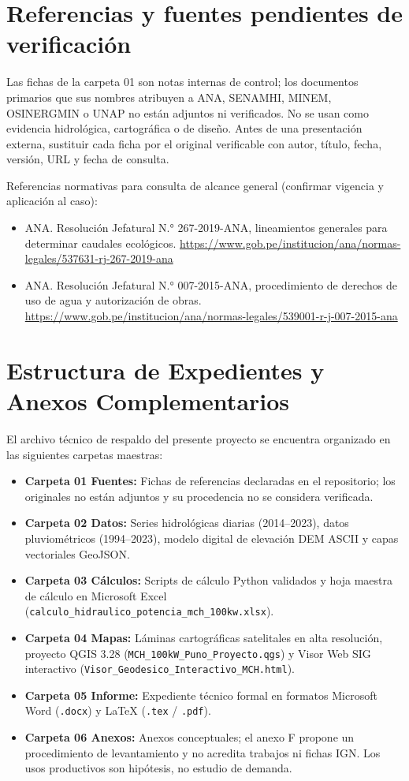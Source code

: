 \documentclass[11pt,a4paper]{report}
\begin{document}
\chapter{Referencias y fuentes pendientes de verificación}
Las fichas de la carpeta 01 son notas internas de control; los documentos primarios que sus nombres atribuyen a ANA, SENAMHI, MINEM, OSINERGMIN o UNAP no están adjuntos ni verificados. No se usan como evidencia hidrológica, cartográfica o de diseño. Antes de una presentación externa, sustituir cada ficha por el original verificable con autor, título, fecha, versión, URL y fecha de consulta.

Referencias normativas para consulta de alcance general (confirmar vigencia y aplicación al caso):
\begin{itemize}
  \item ANA. Resolución Jefatural N.° 267-2019-ANA, lineamientos generales para determinar caudales ecológicos. \url{https://www.gob.pe/institucion/ana/normas-legales/537631-rj-267-2019-ana}
  \item ANA. Resolución Jefatural N.° 007-2015-ANA, procedimiento de derechos de uso de agua y autorización de obras. \url{https://www.gob.pe/institucion/ana/normas-legales/539001-r-j-007-2015-ana}
\end{itemize}

\chapter*{Estructura de Expedientes y Anexos Complementarios}
El archivo técnico de respaldo del presente proyecto se encuentra organizado en las siguientes carpetas maestras:
\begin{itemize}
    \item \textbf{Carpeta 01 Fuentes:} Fichas de referencias declaradas en el repositorio; los originales no están adjuntos y su procedencia no se considera verificada.
    \item \textbf{Carpeta 02 Datos:} Series hidrológicas diarias (2014--2023), datos pluviométricos (1994--2023), modelo digital de elevación DEM ASCII y capas vectoriales GeoJSON.
    \item \textbf{Carpeta 03 Cálculos:} Scripts de cálculo Python validados y hoja maestra de cálculo en Microsoft Excel (\texttt{calculo\_hidraulico\_potencia\_mch\_100kw.xlsx}).
    \item \textbf{Carpeta 04 Mapas:} Láminas cartográficas satelitales en alta resolución, proyecto QGIS 3.28 (\texttt{MCH\_100kW\_Puno\_Proyecto.qgs}) y Visor Web SIG interactivo (\texttt{Visor\_Geodesico\_Interactivo\_MCH.html}).
    \item \textbf{Carpeta 05 Informe:} Expediente técnico formal en formatos Microsoft Word (\texttt{.docx}) y LaTeX (\texttt{.tex} / \texttt{.pdf}).
    \item \textbf{Carpeta 06 Anexos:} Anexos conceptuales; el anexo F propone un procedimiento de levantamiento y no acredita trabajos ni fichas IGN. Los usos productivos son hipótesis, no estudio de demanda.
\end{itemize}
\end{document}
